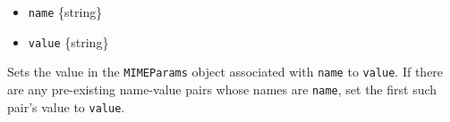 \begin{itemize}
\tightlist
\item
  \texttt{name} \{string\}
\item
  \texttt{value} \{string\}
\end{itemize}

Sets the value in the \texttt{MIMEParams} object associated with
\texttt{name} to \texttt{value}. If there are any pre-existing
name-value pairs whose names are \texttt{name}, set the first such
pair's value to \texttt{value}.

\begin{Shaded}
\begin{Highlighting}[]
 \OperatorTok{;}

\OperatorTok{=}  \NormalTok{(}\NormalTok{)}\OperatorTok{;}
\NormalTok{(}\OperatorTok{,} \NormalTok{)}\OperatorTok{;}
\NormalTok{(}\OperatorTok{,} \NormalTok{)}\OperatorTok{;}
\NormalTok{())}\OperatorTok{;}
\end{Highlighting}
\end{Shaded}

\begin{Shaded}
\begin{Highlighting}[]
\OperatorTok{=} \NormalTok{(}\NormalTok{)}\OperatorTok{;}

\OperatorTok{=}  \NormalTok{(}\NormalTok{)}\OperatorTok{;}
\NormalTok{(}\OperatorTok{,} \NormalTok{)}\OperatorTok{;}
\NormalTok{(}\OperatorTok{,} \NormalTok{)}\OperatorTok{;}
\NormalTok{())}\OperatorTok{;}
\end{Highlighting}
\end{Shaded}

